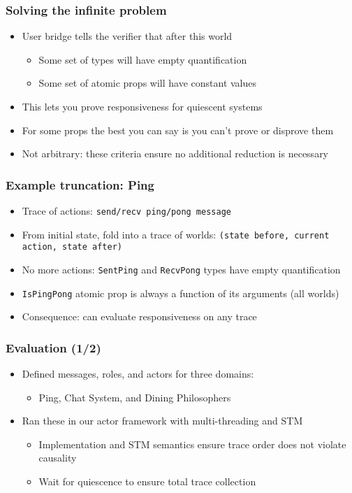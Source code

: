 \documentclass[12pt,aspectratio=169]{beamer}
\begin{document}
\begin{frame}
\frametitle{Solving the infinite problem}
\begin{itemize}
  \item User bridge tells the verifier that after this world
  \begin{itemize}
    \item Some set of types will have empty quantification
    \item Some set of atomic props will have constant values
  \end{itemize}
  \item This lets you prove responsiveness for quiescent systems
  \item For some props the best you can say is you can't prove or disprove them
  \item Not arbitrary: these criteria ensure no additional reduction is necessary
\end{itemize}
\end{frame}

\begin{frame}
\frametitle{Example truncation: Ping}
\begin{itemize}
  \item Trace of actions: \texttt{send/recv ping/pong message}
  \item From initial state, fold into a trace of worlds:
    \linebreak \texttt{(state before, current action, state after)}
  \item No more actions: \texttt{SentPing} and \texttt{RecvPong} types have empty quantification
  \item \texttt{IsPingPong} atomic prop is always a function of its arguments (all worlds)
  \item Consequence: can evaluate responsiveness on any trace
\end{itemize}
\end{frame}

\begin{frame}
\frametitle{Evaluation (1/2)}
\begin{itemize}
  \item Defined messages, roles, and actors for three domains:
  \begin{itemize}
    \item Ping, Chat System, and Dining Philosophers
  \end{itemize}
  \item Ran these in our actor framework with multi-threading and STM
  \begin{itemize}
    \item Implementation and STM semantics ensure trace order does not violate causality
    \item Wait for quiescence to ensure total trace collection
  \end{itemize}
\end{itemize}
\end{frame}
\end{document}
